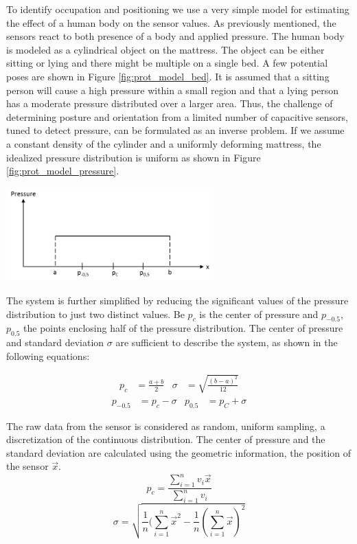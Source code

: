 To identify occupation and positioning we use a very simple model for estimating the effect of a human body on the sensor values. As previously mentioned, the sensors react to both presence of a body and applied pressure. The human body is modeled as a cylindrical object on the mattress. The object can be either sitting or lying and there might be multiple on a single bed. A few potential poses are shown in Figure \ref{fig:prot_model_bed}. It is assumed that a sitting person will cause a high pressure within a small region and that a lying person has a moderate pressure distributed over a larger area. Thus, the challenge of determining posture and orientation from a limited number of capacitive sensors, tuned to detect pressure, can be formulated as an inverse problem. If we assume a constant density of the cylinder and a uniformly deforming mattress, the idealized pressure distribution is uniform as shown in Figure \ref{fig:prot_model_pressure}.

\begin{minipage}{\linewidth}
\centering
\includegraphics[width=0.6\textwidth]{images/prot_model_pressure}
\label{fig:prot_model_pressure}
\end{minipage}

The system is further simplified by reducing the significant values of the pressure distribution to just two distinct values. Be $p_c$ is the center of pressure and $p_{-0.5}$, $p_{0.5}$ the points enclosing half of the pressure distribution. The center of pressure and standard deviation $\sigma$ are sufficient to describe the system, as shown in the following equations:

\begin{align}
p_c&=\frac{a+b}{2} & \sigma&=\sqrt{\frac{(b-a)^2}{12}}
\end{align}
\begin{align}
p_{-0.5}&=p_c-\sigma &	p_{0.5}&=p_C+\sigma
\end{align}

The raw data from the sensor is considered as random, uniform sampling, a discretization of the continuous distribution. The center of pressure and the standard deviation are calculated using the geometric information, the position of the sensor $\overrightarrow{x}$.
\begin{equation}
p_c=\frac{\sum_{i=1}^n{v_i\overrightarrow{x}}}{\sum_{i=1}^n{v_i}}
\end{equation}
\begin{equation}
\sigma=\sqrt{\frac{1}{n}(\sum_{i=1}^n{\overrightarrow{x}^2}-\frac{1}{n}(\sum_{i=1}^n{\overrightarrow{x}})^2}
\end{equation}

